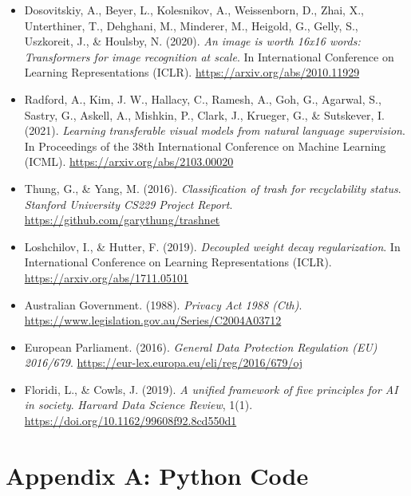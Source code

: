 \documentclass[12pt]{article}
\begin{document}
\begin{itemize}
    \item Dosovitskiy, A., Beyer, L., Kolesnikov, A., Weissenborn, D., Zhai, X., Unterthiner, T., Dehghani, M., Minderer, M., Heigold, G., Gelly, S., Uszkoreit, J., \& Houlsby, N. (2020). \textit{An image is worth 16x16 words: Transformers for image recognition at scale}. In International Conference on Learning Representations (ICLR). \url{https://arxiv.org/abs/2010.11929}

    \item Radford, A., Kim, J. W., Hallacy, C., Ramesh, A., Goh, G., Agarwal, S., Sastry, G., Askell, A., Mishkin, P., Clark, J., Krueger, G., \& Sutskever, I. (2021). \textit{Learning transferable visual models from natural language supervision}. In Proceedings of the 38th International Conference on Machine Learning (ICML). \url{https://arxiv.org/abs/2103.00020}

    \item Thung, G., \& Yang, M. (2016). \textit{Classification of trash for recyclability status}. \textit{Stanford University CS229 Project Report}. \url{https://github.com/garythung/trashnet}

    \item Loshchilov, I., \& Hutter, F. (2019). \textit{Decoupled weight decay regularization}. In International Conference on Learning Representations (ICLR). \url{https://arxiv.org/abs/1711.05101}

    \item Australian Government. (1988). \textit{Privacy Act 1988 (Cth)}. \url{https://www.legislation.gov.au/Series/C2004A03712}

    \item European Parliament. (2016). \textit{General Data Protection Regulation (EU) 2016/679}. \url{https://eur-lex.europa.eu/eli/reg/2016/679/oj}

    \item Floridi, L., \& Cowls, J. (2019). \textit{A unified framework of five principles for AI in society}. \textit{Harvard Data Science Review}, 1(1). \url{https://doi.org/10.1162/99608f92.8cd550d1}
\end{itemize}


\newpage
\section{Appendix A: Python Code}
\end{document}

